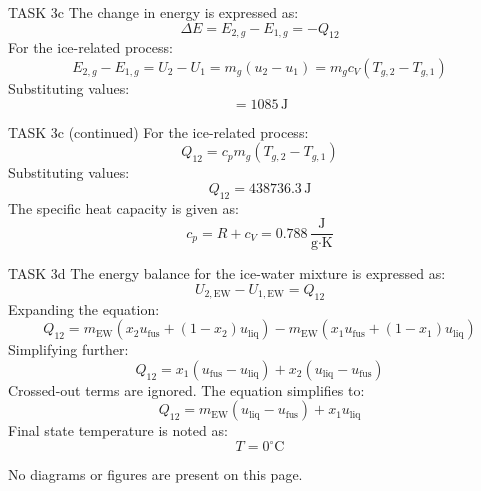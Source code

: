 TASK 3c  
The change in energy is expressed as:  
\[
\Delta E = E_{2,g} - E_{1,g} = -Q_{12}
\]  
For the ice-related process:  
\[
E_{2,g} - E_{1,g} = U_2 - U_1 = m_g (u_2 - u_1) = m_g c_V (T_{g,2} - T_{g,1})
\]  
Substituting values:  
\[
= 1085 \, \text{J}
\]  

TASK 3c (continued)  
For the ice-related process:  
\[
Q_{12} = c_p m_g (T_{g,2} - T_{g,1})
\]  
Substituting values:  
\[
Q_{12} = 438736.3 \, \text{J}
\]  
The specific heat capacity is given as:  
\[
c_p = R + c_V = 0.788 \, \frac{\text{J}}{\text{g·K}}
\]  

TASK 3d  
The energy balance for the ice-water mixture is expressed as:  
\[
U_{2,\text{EW}} - U_{1,\text{EW}} = Q_{12}
\]  
Expanding the equation:  
\[
Q_{12} = m_{\text{EW}} \left( x_2 u_{\text{fus}} + (1 - x_2) u_{\text{liq}} \right) - m_{\text{EW}} \left( x_1 u_{\text{fus}} + (1 - x_1) u_{\text{liq}} \right)
\]  
Simplifying further:  
\[
Q_{12} = x_1 \left( u_{\text{fus}} - u_{\text{liq}} \right) + x_2 \left( u_{\text{liq}} - u_{\text{fus}} \right)
\]  
Crossed-out terms are ignored. The equation simplifies to:  
\[
Q_{12} = m_{\text{EW}} \left( u_{\text{liq}} - u_{\text{fus}} \right) + x_1 u_{\text{liq}}
\]  
Final state temperature is noted as:  
\[
T = 0^\circ\text{C}
\]  

No diagrams or figures are present on this page.